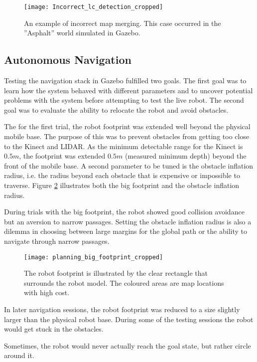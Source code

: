 \begin{figure}[h]
	\centering
	\texttt{[image: Incorrect\_lc\_detection\_cropped]}
	\caption{An example of incorrect map merging. This case occurred in the ''Asphalt'' world simulated in Gazebo.}
	\label{fig:Incorrect_lc_detection}
\end{figure}


\subsection{Autonomous Navigation}

Testing the navigation stack in Gazebo fulfilled two goals. The first goal was to learn how the system behaved with different parameters and to uncover potential problems with the system before attempting to test the live robot. The second goal was to evaluate the ability to relocate the robot and avoid obstacles. 

The for the first trial, the robot footprint was extended well beyond the physical mobile base. The purpose of this was to prevent obstacles from getting too close to the Kinect and \ac{LIDAR}. As the minimum detectable range for the Kinect is $0.5 m$, the footprint was extended $0.5 m$ (measured minimum depth) beyond the front of the mobile base. A second parameter to be tuned is the obstacle inflation radius, i.e. the radius beyond each obstacle that is expensive or impossible to traverse. Figure \ref{fig:big_footprint} illustrates both the big footprint and the obstacle inflation radius.

During trials with the big footprint, the robot showed good collision avoidance but an aversion to narrow passages. Setting the obstacle inflation radius is also a dilemma in choosing between large margins for the global path or the ability to navigate through narrow passages. 

\begin{figure}[h]
	\centering
	\texttt{[image: planning\_big\_footprint\_cropped]}
	\caption{The robot footprint is illustrated by the clear rectangle that surrounds the robot model. The coloured areas are map locations with high cost. }
	\label{fig:big_footprint}
\end{figure}

In later navigation sessions, the robot footprint was reduced to a size slightly larger than the physical robot base. During some of the testing sessions the robot would get stuck in the obstacles. 

Sometimes, the robot would never actually reach the goal state, but rather circle around it. 

